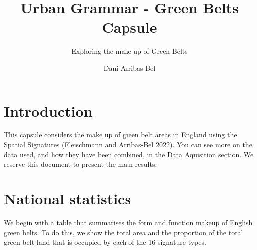 \documentclass[
  letterpaper,
  DIV=11,
  numbers=noendperiod,
  oneside]{scrartcl}
\title{Urban Grammar - Green Belts Capsule}
\subtitle{Exploring the make up of Green Belts}
\author{Dani Arribas-Bel}
\date{}
\begin{document}
\maketitle
\ifdefined\Shaded\renewenvironment{Shaded}{\begin{tcolorbox}[borderline west={3pt}{0pt}{shadecolor}, interior hidden, frame hidden, enhanced, sharp corners, breakable, boxrule=0pt]}{\end{tcolorbox}}\fi

\hypertarget{introduction}{%
\section{Introduction}\label{introduction}}

This capsule considers the make up of green belt areas in England
using the Spatial Signatures (Fleischmann and Arribas-Bel 2022). You can
see more on the data used, and how they have been combined, in the
\href{data_acquisition.ipynb}{Data Aquisition} section. We reserve this
document to present the main results.

\hypertarget{national-statistics}{%
\section{National statistics}\label{national-statistics}}

We begin with a table that summarises the form and function makeup of
English green belts. To do this, we show the total area and the
proportion of the total green belt land that is occupied by each of the
16 signature types.
\end{document}
